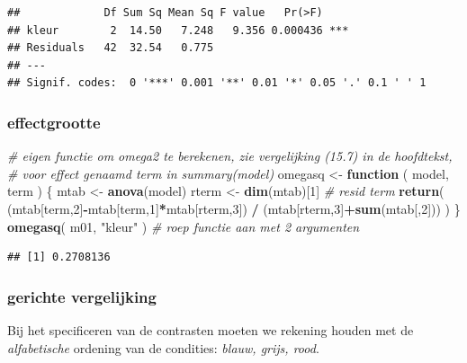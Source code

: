 \documentclass[
]{book}
\newenvironment{Shaded}{\begin{snugshade}}{\end{snugshade}}
\newcommand{\CommentTok}[1]{\textcolor[rgb]{0.56,0.35,0.01}{\textit{#1}}}
\newcommand{\ControlFlowTok}[1]{\textcolor[rgb]{0.13,0.29,0.53}{\textbf{#1}}}
\newcommand{\DecValTok}[1]{\textcolor[rgb]{0.00,0.00,0.81}{#1}}
\newcommand{\KeywordTok}[1]{\textcolor[rgb]{0.13,0.29,0.53}{\textbf{#1}}}
\newcommand{\NormalTok}[1]{#1}
\newcommand{\OperatorTok}[1]{\textcolor[rgb]{0.81,0.36,0.00}{\textbf{#1}}}
\newcommand{\StringTok}[1]{\textcolor[rgb]{0.31,0.60,0.02}{#1}}
\begin{document}
\begin{verbatim}
##             Df Sum Sq Mean Sq F value   Pr(>F)    
## kleur        2  14.50   7.248   9.356 0.000436 ***
## Residuals   42  32.54   0.775                     
## ---
## Signif. codes:  0 '***' 0.001 '**' 0.01 '*' 0.05 '.' 0.1 ' ' 1
\end{verbatim}

\hypertarget{R:omega-kwadraat}{%
\subsubsection{effectgrootte}\label{R:omega-kwadraat}}

\begin{Shaded}
\begin{Highlighting}[]
\CommentTok{\# eigen functie om omega2 te berekenen, zie vergelijking (15.7) in de hoofdtekst, }
\CommentTok{\# voor effect genaamd \textasciigrave{}term\textasciigrave{} in summary(\textasciigrave{}model\textasciigrave{})}
\NormalTok{omegasq \textless{}{-}}\StringTok{ }\ControlFlowTok{function}\NormalTok{ ( model, term ) \{   }
\NormalTok{     mtab \textless{}{-}}\StringTok{ }\KeywordTok{anova}\NormalTok{(model)}
\NormalTok{     rterm \textless{}{-}}\StringTok{ }\KeywordTok{dim}\NormalTok{(mtab)[}\DecValTok{1}\NormalTok{] }\CommentTok{\# resid term}
     \KeywordTok{return}\NormalTok{( (mtab[term,}\DecValTok{2}\NormalTok{]}\OperatorTok{{-}}\NormalTok{mtab[term,}\DecValTok{1}\NormalTok{]}\OperatorTok{*}\NormalTok{mtab[rterm,}\DecValTok{3}\NormalTok{]) }\OperatorTok{/}\StringTok{ }
\StringTok{             }\NormalTok{(mtab[rterm,}\DecValTok{3}\NormalTok{]}\OperatorTok{+}\KeywordTok{sum}\NormalTok{(mtab[,}\DecValTok{2}\NormalTok{])) )}
\NormalTok{     \}}
\KeywordTok{omegasq}\NormalTok{( m01, }\StringTok{"kleur"}\NormalTok{ ) }\CommentTok{\# roep functie aan met 2 argumenten}
\end{Highlighting}
\end{Shaded}

\begin{verbatim}
## [1] 0.2708136
\end{verbatim}

\hypertarget{gerichte-vergelijking-1}{%
\subsubsection{gerichte vergelijking}\label{gerichte-vergelijking-1}}

Bij het specificeren van de contrasten moeten we rekening houden met de \emph{alfabetische} ordening van de condities: \emph{blauw, grijs, rood}.
\end{document}
